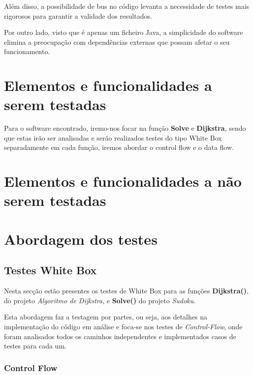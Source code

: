 \documentclass{article}
\begin{document}
Além disso, a possibilidade de bus no código levanta a necessidade de testes mais rigorosos para garantir a validade dos resultados.

Por outro lado, visto que é apenas um ficheiro Java, a simplicidade do software elimina a preocupação com dependências externas que possam afetar o seu funcionamento.

\section{Elementos e funcionalidades a serem testadas}

Para o software encontrado, iremo-nos focar na função \textbf{Solve} e \textbf{Dijkstra}, sendo que estas irão ser analisadas e serão realizados testes do tipo White Box separadamente em cada função, iremos abordar o control flow e o data flow.



\section{Elementos e funcionalidades a não serem testadas}

\section{Abordagem dos testes}
\subsection{Testes White Box}
Nesta secção estão presentes os testes de White Box para as funções \textbf{Dijkstra()}, do projeto \textit{Algoritmo de Dijkstra}, e  \textbf{Solve()} do projeto \textit{Sudoku}.

Esta abordagem faz a testagem por partes, ou seja, aos detalhes na implementação do código em análise e foca-se nos testes de \textit{Control-Flow}, onde foram analisados todos os caminhos independentes e implementados casos de testes para cada um.

\subsubsection{Control Flow}
\end{document}
